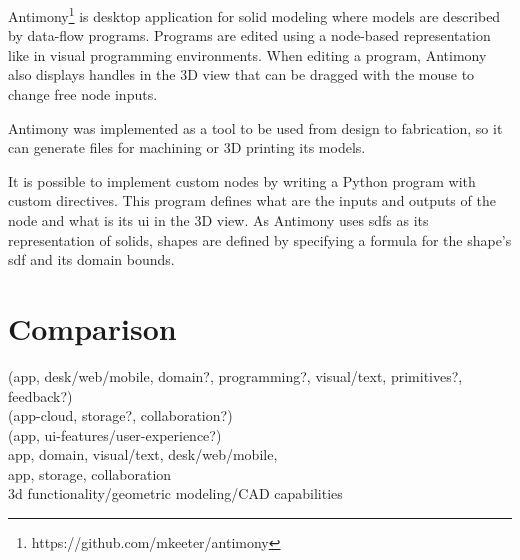 Antimony\footnote{https://github.com/mkeeter/antimony} is desktop application for solid modeling where models are described by data-flow programs.
Programs are edited using a node-based representation like in visual programming environments.
When editing a program, Antimony also displays handles in the 3D view that can be dragged with the mouse to change free node inputs.

Antimony was implemented as a tool to be used from design to fabrication, so it can generate files for machining or 3D printing its models.

It is possible to implement custom nodes by writing a Python program with custom directives.
This program defines what are the inputs and outputs of the node and what is its \gls{ui} in the 3D view.
As Antimony uses \glspl{sdf} as its representation of solids, shapes are defined by specifying a formula for the shape's \gls{sdf} and its domain bounds.

\section{Comparison}

(app, desk/web/mobile, domain?, programming?, visual/text, primitives?, feedback?)\\
(app-cloud, storage?, collaboration?)\\
(app, ui-features/user-experience?)\\
app, domain, visual/text, desk/web/mobile,\\
app, storage, collaboration\\
3d functionality/geometric modeling/CAD capabilities\\

